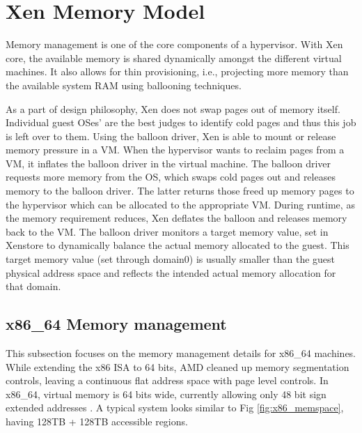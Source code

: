 \section{Xen Memory Model}

Memory management is one of the core components of a hypervisor. With Xen core, the available memory is shared dynamically amongst the different virtual machines. It also allows for thin provisioning, i.e., projecting more memory than the available system RAM using ballooning techniques.

As a part of design philosophy, Xen does not swap pages out of memory itself. Individual guest OSes’ are the best judges to identify cold pages and thus this job is left over to them. Using the balloon driver, Xen is able to mount or release memory pressure in a VM. When the hypervisor wants to reclaim pages from a VM, it inflates the balloon driver in the virtual machine. The balloon driver requests more memory from the OS, which swaps cold pages out and releases memory to the balloon driver. The latter returns those freed up memory pages to the hypervisor which can be allocated to the appropriate VM. During runtime, as the memory requirement reduces, Xen deflates the balloon and releases memory back to the VM. The balloon driver monitors a target memory value, set in Xenstore to dynamically balance the actual memory allocated to the guest. This target memory value (set through domain0) is usually smaller than the guest physical address space and reflects the intended actual memory allocation for that domain. 
 

\subsection{x86\_64 Memory management}
This subsection focuses on the memory management details for x86\_64 machines. While extending the x86 ISA to 64 bits, AMD cleaned up memory segmentation controls, leaving a continuous flat address space with page level controls. In x86\_64, virtual memory is 64 bits wide, currently allowing only 48 bit sign extended addresses \cite{intel_manual}. A typical system looks similar to Fig \ref{fig:x86_memspace}, having 128TB + 128TB accessible regions. 

